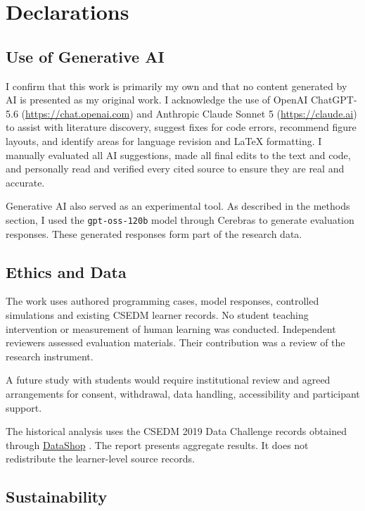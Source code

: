 \chapter*{Declarations}

\section*{Use of Generative AI}

I confirm that this work is primarily my own and that no content generated by AI is presented as my original work. I acknowledge the use of OpenAI ChatGPT-5.6 (\href{https://chat.openai.com}{https://chat.openai.com}) and Anthropic Claude Sonnet 5 (\href{https://claude.ai}{https://claude.ai}) to assist with literature discovery, suggest fixes for code errors, recommend figure layouts, and identify areas for language revision and LaTeX formatting. I manually evaluated all AI suggestions, made all final edits to the text and code, and personally read and verified every cited source to ensure they are real and accurate.

Generative AI also served as an experimental tool. As described in the methods section, I used the \texttt{gpt-oss-120b} model through Cerebras to generate evaluation responses. These generated responses form part of the research data.

\section*{Ethics and Data}

The work uses authored programming cases, model responses, controlled simulations and existing CSEDM learner records.
No student teaching intervention or measurement of human learning was conducted. Independent reviewers assessed evaluation
materials. Their contribution was a review of the research instrument.

A future study with students would require institutional review and agreed arrangements for consent, withdrawal, data handling,
accessibility and participant support.

The historical analysis uses the CSEDM 2019 Data Challenge records obtained through
\href{https://pslcdatashop.web.cmu.edu/DatasetInfo?datasetId=2865}{DataShop} \parencite{csedm2019challenge}. The report presents
aggregate results. It does not redistribute the learner-level source records.

\section*{Sustainability}

